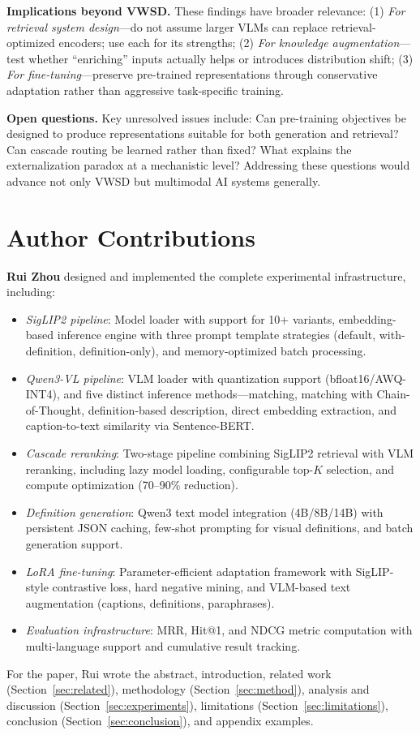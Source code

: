 \documentclass[11pt]{article}
\begin{document}
\textbf{Implications beyond VWSD.} These findings have broader relevance: (1) \textit{For retrieval system design}---do not assume larger VLMs can replace retrieval-optimized encoders; use each for its strengths; (2) \textit{For knowledge augmentation}---test whether ``enriching'' inputs actually helps or introduces distribution shift; (3) \textit{For fine-tuning}---preserve pre-trained representations through conservative adaptation rather than aggressive task-specific training.

\textbf{Open questions.} Key unresolved issues include: Can pre-training objectives be designed to produce representations suitable for both generation and retrieval? Can cascade routing be learned rather than fixed? What explains the externalization paradox at a mechanistic level? Addressing these questions would advance not only VWSD but multimodal AI systems generally.

\section*{Author Contributions}

\textbf{Rui Zhou} designed and implemented the complete experimental infrastructure, including:
\begin{itemize}
    \item \textit{SigLIP2 pipeline}: Model loader with support for 10+ variants, embedding-based inference engine with three prompt template strategies (default, with-definition, definition-only), and memory-optimized batch processing.
    \item \textit{Qwen3-VL pipeline}: VLM loader with quantization support (bfloat16/AWQ-INT4), and five distinct inference methods---matching, matching with Chain-of-Thought, definition-based description, direct embedding extraction, and caption-to-text similarity via Sentence-BERT.
    \item \textit{Cascade reranking}: Two-stage pipeline combining SigLIP2 retrieval with VLM reranking, including lazy model loading, configurable top-$K$ selection, and compute optimization (70--90\% reduction).
    \item \textit{Definition generation}: Qwen3 text model integration (4B/8B/14B) with persistent JSON caching, few-shot prompting for visual definitions, and batch generation support.
    \item \textit{LoRA fine-tuning}: Parameter-efficient adaptation framework with SigLIP-style contrastive loss, hard negative mining, and VLM-based text augmentation (captions, definitions, paraphrases).
    \item \textit{Evaluation infrastructure}: MRR, Hit@1, and NDCG metric computation with multi-language support and cumulative result tracking.
\end{itemize}
For the paper, Rui wrote the abstract, introduction, related work (Section~\ref{sec:related}), methodology (Section~\ref{sec:method}), analysis and discussion (Section~\ref{sec:experiments}), limitations (Section~\ref{sec:limitations}), conclusion (Section~\ref{sec:conclusion}), and appendix examples.
\end{document}
